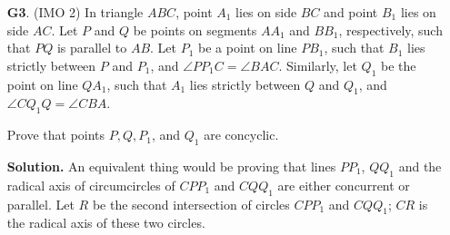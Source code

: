 \documentclass[11pt,a4paper]{article}
\begin{document}
\begin{enumerate}
	
	\item [\textbf{G3}.] (IMO 2) In triangle $ABC$, point $A_1$ lies on side $BC$ and point $B_1$ lies on side $AC$. Let $P$ and $Q$ be points on segments $AA_1$ and $BB_1$, respectively, such that $PQ$ is parallel to $AB$. Let $P_1$ be a point on line $PB_1$, such that $B_1$ lies strictly between $P$ and $P_1$, and $\angle PP_1C=\angle BAC$. Similarly, let $Q_1$ be the point on line $QA_1$, such that $A_1$ lies strictly between $Q$ and $Q_1$, and $\angle CQ_1Q=\angle CBA$.
	
	Prove that points $P,Q,P_1$, and $Q_1$ are concyclic.
	
	\textbf{Solution.} An equivalent thing would be proving that lines $PP_1$, $QQ_1$ and the radical axis of circumcircles of $CPP_1$ and $CQQ_1$ are either concurrent or parallel. Let $R$ be the second intersection of circles $CPP_1$ and $CQQ_1$; $CR$ is the radical axis of these two circles. 
	

\end{enumerate}
\end{document}
